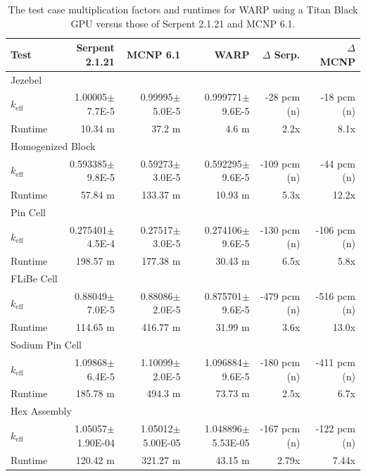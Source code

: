 \documentclass[preprint,12pt]{elsarticle}
\begin{document}
\begin{table}[h]
\centering
\caption{The test case multiplication factors and runtimes for WARP using a Titan Black GPU versus those of Serpent 2.1.21 and MCNP 6.1.}
\label{results_table_titan}
\footnotesize
\begin{tabular}{| l | r | r | r || r | r |}
\hline
Test & Serpent 2.1.21 & MCNP 6.1 & WARP & $\Delta$ Serp. & $\Delta$ MCNP  \\
\hline
\hline
\multicolumn{6}{|l|}{Jezebel} \\
\hline
$k_\mathrm{eff}$ & 1.00005$\pm$7.7E-5 &	0.99995$\pm$5.0E-5 &	0.999771$\pm$9.6E-5 &	-28 pcm (n) &	 -18 pcm (n) \\
\hline
Runtime & 10.34 m  &	37.2  m &	4.6  m &	  2.2x      &	8.1x \\
\hline
\hline
\multicolumn{6}{|l|}{Homogenized Block }\\
\hline
$k_\mathrm{eff}$ & 0.593385$\pm$9.8E-5 &	0.59273$\pm$3.0E-5 &	0.592295$\pm$9.6E-5 &	-109  pcm (n)&	-44 pcm  (n)\\
\hline
Runtime & 57.84  m &	133.37 m  &	10.93 m  &	5.3x &	12.2x \\
\hline
\hline
\multicolumn{6}{|l|}{Pin Cell}\\
\hline
$k_\mathrm{eff}$ & 0.275401$\pm$4.5E-4 &	0.27517$\pm$3.0E-5 &	0.274106$\pm$9.6E-5 &	-130  pcm (n)&	-106  pcm (n)\\
\hline
Runtime & 198.57 m &	177.38 m &	30.43  m &	6.5x &	5.8x \\
\hline
\hline
\multicolumn{6}{|l|}{FLiBe Cell}\\
\hline
$k_\mathrm{eff}$ & 0.88049$\pm$7.0E-5 &	0.88086$\pm$2.0E-5 &	0.875701$\pm$9.6E-5 &	-479  pcm (n) &	-516 pcm  (n)\\
\hline
Runtime & 114.65 m  &	416.77 m  &	31.99 m  &	3.6x &	13.0x \\
\hline
\hline
\multicolumn{6}{|l|}{Sodium Pin Cell}\\
\hline
$k_\mathrm{eff}$ & 1.09868$\pm$6.4E-5 &	1.10099$\pm$2.0E-5 &	1.096884$\pm$9.6E-5 &	-180  pcm (n) &	-411 pcm (n) \\
\hline
Runtime & 185.78 m  &	494.3 m  &	73.73  m &	2.5x &	6.7x \\
\hline
\hline
\multicolumn{6}{|l|}{Hex Assembly}\\
\hline
$k_\mathrm{eff}$ & 1.05057$\pm$1.90E-04 &	1.05012$\pm$5.00E-05 &	1.048896$\pm$5.53E-05 &	-167 pcm (n) &	-122 pcm (n)  \\
\hline
Runtime & 120.42 m  &	321.27 m  &	43.15  m &	2.79x &	7.44x \\
\hline
\end{tabular}
\end{table}
\end{document}
